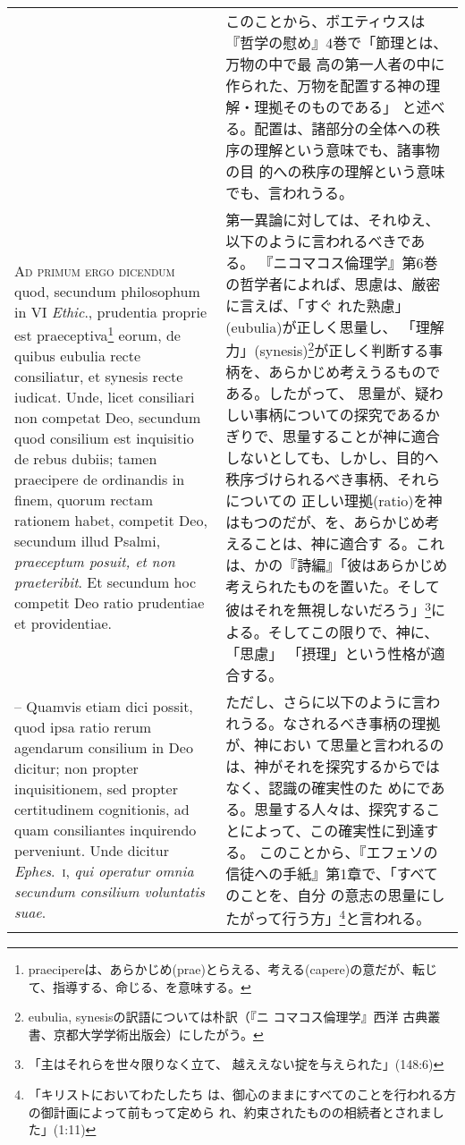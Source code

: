 \documentclass[10pt]{jsarticle} %
\begin{document}
\begin{longtable}{p{21em}p{21em}}
&

このことから、ボエティウスは『哲学の慰め』4巻で「節理とは、万物の中で最
 高の第一人者の中に作られた、万物を配置する神の理解・理拠そのものである」
 と述べる。配置は、諸部分の全体への秩序の理解という意味でも、諸事物の目
 的への秩序の理解という意味でも、言われうる。

\\


{\scshape Ad primum ergo dicendum} quod, secundum
philosophum in VI {\itshape Ethic}., prudentia proprie est praeceptiva\footnote{praecipereは、あらかじめ(prae)とらえる、考える(capere)の意だが、転じて、指導する、命じる、を意味する。} eorum, de
quibus eubulia recte consiliatur, et synesis recte iudicat. Unde, licet
consiliari non competat Deo, secundum quod consilium est inquisitio de
rebus dubiis; tamen praecipere de ordinandis in finem, quorum rectam
rationem habet, competit Deo, secundum illud Psalmi, {\itshape praeceptum posuit,
et non praeteribit}. Et secundum hoc competit Deo ratio prudentiae et
providentiae. 


&


第一異論に対しては、それゆえ、以下のように言われるべきである。
『ニコマコス倫理学』第6巻の哲学者によれば、思慮は、厳密に言えば、「すぐ
 れた熟慮」(eubulia)が正しく思量し、
「理解力」(synesis)\footnote{eubulia, synesisの訳語については朴訳（『ニ
 コマコス倫理学』西洋
 古典叢書、京都大学学術出版会）にしたがう。}が正しく判断する事柄を、あらかじめ考えうるものである。したがって、
思量が、疑わしい事柄についての探究であるかぎりで、思量することが神に適合
 しないとしても、しかし、目的へ秩序づけられるべき事柄、それらについての
 正しい理拠(ratio)を神はもつのだが、を、あらかじめ考えることは、神に適合す
 る。これは、かの『詩編』「彼はあらかじめ考えられたものを置いた。そして
 彼はそれを無視しないだろう」\footnote{「主はそれらを世々限りなく立て、
 越ええない掟を与えられた」(148:6)}による。そしてこの限りで、神に、「思慮」
 「摂理」という性格が適合する。


\\


-- Quamvis etiam dici possit, quod ipsa ratio rerum agendarum
consilium in Deo dicitur; non propter inquisitionem, sed propter
certitudinem cognitionis, ad quam consiliantes inquirendo
perveniunt. Unde dicitur {\itshape Ephes}.~{\scshape i}, {\itshape qui operatur omnia secundum consilium
voluntatis suae}.

&

ただし、さらに以下のように言われうる。なされるべき事柄の理拠が、神におい
 て思量と言われるのは、神がそれを探究するからではなく、認識の確実性のた
 めにである。思量する人々は、探究することによって、この確実性に到達する。
 このことから、『エフェソの信徒への手紙』第1章で、「すべてのことを、自分
 の意志の思量にしたがって行う方」\footnote{「キリストにおいてわたしたち
 は、御心のままにすべてのことを行われる方の御計画によって前もって定めら
 れ、約束されたものの相続者とされました」(1:11)}と言われる。




\end{longtable}
\end{document}
